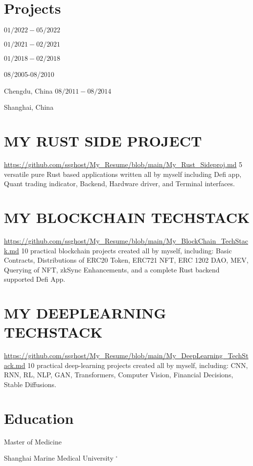 \documentclass[10pt]{article}
\begin{document}
\section*{Projects}
$01 / 2022-05 / 2022$

$01 / 2021-02 / 2021$

$01 / 2018-02 / 2018$

08/2005-08/2010

Chengdu, China $08 / 2011-08 / 2014$

Shanghai, China

\section*{MY RUST SIDE PROJECT}
\href{https://github.com/ssghost/My_Resume/blob/main/My_Rust_Sideproj.md}{https://github.com/ssghost/My\_Resume/blob/main/My\_Rust\_Sideproj.md} 5 versatile pure Rust based applications written all by myself including Defi app, Quant trading indicator, Backend, Hardware driver, and Terminal interfaces.

\section*{MY BLOCKCHAIN TECHSTACK}
\href{https://github.com/ssghost/My_Resume/blob/main/My_BlockChain_TechStack.md}{https://github.com/ssghost/My\_Resume/blob/main/My\_BlockChain\_TechStack.md} 10 practical blockchain projects created all by myself, including: Basic Contracts, Distributions of ERC20 Token, ERC721 NFT, ERC 1202 DAO, MEV, Querying of NFT, zkSync Enhancements, and a complete Rust backend supported Defi App.

\section*{MY DEEPLEARNING TECHSTACK}
\href{https://github.com/ssghost/My_Resume/blob/main/My_DeepLearning_TechStack.md}{https://github.com/ssghost/My\_Resume/blob/main/My\_DeepLearning\_TechStack.md} 10 practical deep-learning projects created all by myself, including: CNN, RNN, RL, NLP, GAN, Transformers, Computer Vision, Financial Decisions, Stable Diffusions.

\section*{Education}
Master of Medicine

Shanghai Marine Medical University ${ }^{\square}$
\end{document}
